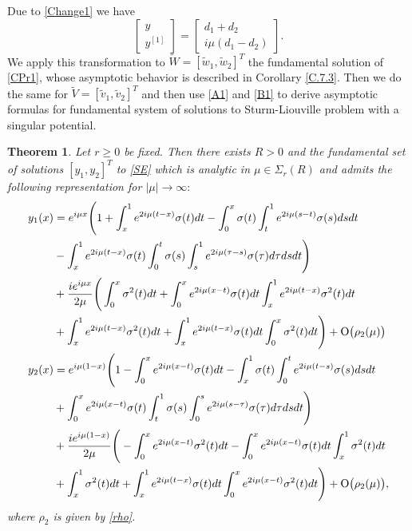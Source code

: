 \documentclass[11pt]{amsart}
\theoremstyle{plain}
\newtheorem{thm}{Theorem}[section]
\theoremstyle{definition}
\theoremstyle{remark}
\numberwithin{equation}{section}
\begin{document}
Due to \eqref{Change1} we have
\begin{equation}\label{change2}
\left[\begin{array} {c}
y \\
y^{[1]}\end{array}
\right]=
\left[\begin{array} {c}
d_1+d_2 \\
i\mu(d_1-d_2)\end{array}
\right].
\end{equation}
We apply this transformation to $\widetilde{W}=[\tilde{w}_1,\tilde{w}_2]^T$  the fundamental solution of \eqref{CPr1},
whose asymptotic behavior is described in Corollary \ref{C.7.3}.
Then we do the same for  $\widetilde{V}=[\tilde{v}_1,\tilde{v}_2]^T$ and then use  \eqref{A1} and \eqref{B1} to derive asymptotic formulas for
fundamental system of solutions to Sturm-Liouville problem with a singular potential.
\begin{thm}\label{Sl}
Let $r\geq 0$ be fixed. Then there exists $R>0$ and the fundamental set of solutions $[y_1,y_2]^T$ to \eqref{SE} which
is analytic in $\mu \in \Sigma_r(R)$ and admits the following representation for
 $|\mu| \to \infty:$
\begin{align*}
y_1(x)&=e^{i \mu x}\Bigg(1+\int_x^1 e^{2i \mu (t-x)}\sigma(t)dt-\int_0^x \sigma(t)\int_t^1e^{2i\mu(s-t)}\sigma(s)dsdt\nonumber\\
&- \int_x^1 e^{2i \mu (t-x) }\sigma(t)\int_0^t\sigma(s)\int_s^1 e^{2i \mu (\tau-s) }\sigma(\tau)d \tau ds dt\Bigg)\\
&+ \frac{ie^{i\mu x}}{2\mu}\Bigg(\int_0^x \sigma^2(t)dt+\int_0^x e^{2i\mu(x-t)}\sigma(t)dt\int_x^1 e^{2i\mu(t-x)}\sigma^2(t)dt\\
&+\int_x^1 e^{2i\mu(t-x)}\sigma^2(t)dt
+ \int_x^1 e^{2i\mu(t-x)}\sigma(t)dt\int_0^x\sigma^2(t)dt\Bigg)
+{\rm O}\big(\rho_2(\mu)\big)\\
y_2(x)&=e^{i \mu(1-x)}\Bigg(1-\int_0^x e^{2i \mu (x-t)}\sigma(t)dt-\int_x^1 \sigma(t)\int_0^te^{2i\mu(t-s)}\sigma(s)dsdt\nonumber\\
&+ \int_0^x e^{2i \mu (x-t) }\sigma(t)\int_t^1\sigma(s)\int_0^s e^{2i \mu (s-\tau) }\sigma(\tau)d \tau ds dt \Bigg)\\
&+\frac{ie^{i\mu(1-x)}}{2\mu}\Bigg(-\int_0^x e^{2i\mu(x-t)}\sigma^2(t)dt-\int_0^x e^{2i\mu(x-t)}\sigma(t)dt\int_x^1 \sigma^2(t)dt\nonumber\\
&
+\int_x^1 \sigma^2(t)dt+\int_x^1 e^{2i\mu(t-x)}\sigma(t)dt\int_0^x e^{2i\mu(x-t)}\sigma^2(t)dt\Bigg)+{\rm O}\big(\rho_2(\mu)\big),
\end{align*}
where $\rho_2$ is given by \eqref{rho}.
\end{thm}
\end{document}
